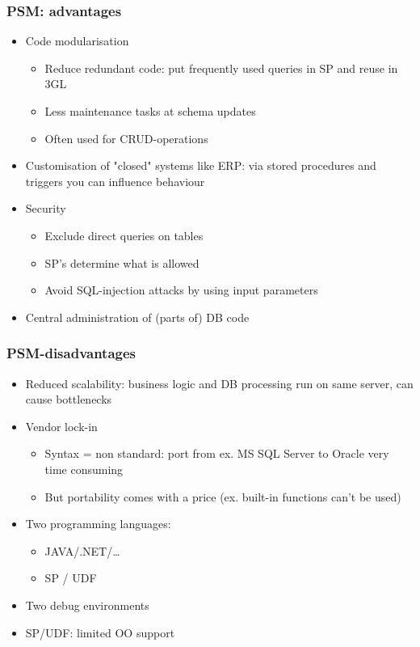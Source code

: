 \documentclass{report}
\begin{document}
    \subsubsection{PSM: advantages}
    \begin{itemize}
        \item Code modularisation
        \begin{itemize}
            \item Reduce redundant code: put frequently used queries in SP and reuse in 3GL
            \item Less maintenance tasks at schema updates
            \item Often used for CRUD-operations
        \end{itemize}
        \item Customisation of "closed" systems like ERP: via stored procedures and triggers you can influence behaviour
        \item Security
        \begin{itemize}
            \item Exclude direct queries on tables
            \item SP's determine what is allowed
            \item Avoid SQL-injection attacks by using input parameters
        \end{itemize}
        \item Central administration of (parts of) DB code
    \end{itemize}

    \subsubsection{PSM-disadvantages}
    \begin{itemize}
        \item Reduced scalability: business logic and DB processing run on same server, can cause bottlenecks
        \item Vendor lock-in
        \begin{itemize}
            \item Syntax = non standard: port from ex. MS SQL Server to Oracle very time consuming
            \item But portability comes with a price (ex. built-in functions can't be used)
        \end{itemize}
        \item Two programming languages:
        \begin{itemize}
            \item JAVA/.NET/\ldots
            \item SP / UDF
        \end{itemize}
        \item Two debug environments
        \item SP/UDF: limited OO support
    \end{itemize}
\end{document}
